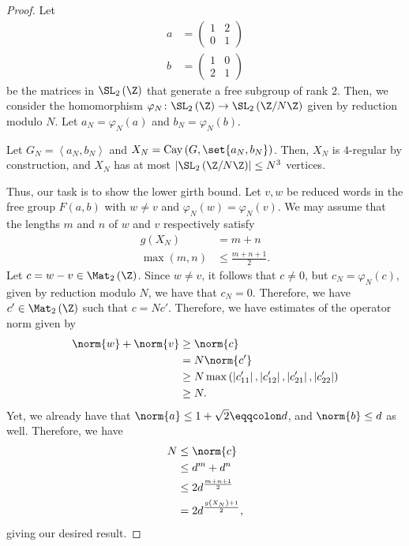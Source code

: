 \documentclass[10pt]{mypackage}
\renewcommand{\eqcolon}{\eqqcolon}
\begin{document}
\begin{proof}
  Let
  \begin{align*}
    a &= \begin{pmatrix}1 & 2 \\ 0 & 1\end{pmatrix}\\
    b &= \begin{pmatrix}1 & 0 \\ 2 & 1\end{pmatrix}
  \end{align*}
  be the matrices in $\SL_2\left( \Z \right)$ that generate a free subgroup of rank $2$. Then, we consider the homomorphism $\varphi_N\colon \SL_2\left( \Z \right)\rightarrow \SL_2\left( \Z/N\Z \right)$ given by reduction modulo $N$. Let $a_N = \varphi_N\left( a \right)$ and $b_N = \varphi_N\left( b \right)$.

  Let $G_N = \left\langle a_N,b_N \right\rangle$ and $X_N = \operatorname{Cay}\left( G,\set{a_N,b_N} \right)$. Then, $X_N$ is $4$-regular by construction, and $X_N$ has at most $\left\vert \SL_2\left( \Z/N\Z \right) \right\vert\leq N^3$ vertices.

  Thus, our task is to show the lower girth bound. Let $v,w$ be reduced words in the free group $F(a,b)$ with $w\neq v$ and $\varphi_N\left( w \right) = \varphi_N\left( v \right)$. We may assume that the lengths $m$ and $n$ of $w$ and $v$ respectively satisfy
  \begin{align*}
    g\left( X_N \right) &= m + n\\
    \max\left( m,n \right) &\leq \frac{m + n + 1}{2}.
  \end{align*}
  Let $c = w-v\in \Mat_{2}\left( \Z \right)$. Since $w\neq v$, it follows that $c\neq 0$, but $c_N = \varphi_N\left( c \right)$, given by reduction modulo $N$, we have that $c_N = 0$. Therefore, we have $c'\in \Mat_2\left( \Z \right)$ such that $c = Nc'$. Therefore, we have estimates of the operator norm given by
  \begin{align*}
    \norm{w} + \norm{v} &\geq \norm{c}\\
                        &= N\norm{c'}\\
                        &\geq N\max\left( \left\vert c'_{11} \right\vert,\left\vert c'_{12} \right\vert,\left\vert c'_{21} \right\vert,\left\vert c'_{22} \right\vert \right)\\
                        &\geq N.
  \end{align*}
  Yet, we already have that $\norm{a} \leq 1 + \sqrt{2}\eqcolon d$, and $\norm{b}\leq d$ as well. Therefore, we have
  \begin{align*}
    N&\leq \norm{c}\\
     &\leq d^m + d^n\\
     &\leq 2d^{\frac{m + n + 1}{2}}\\
     &= 2d^{\frac{g\left( X_N \right) + 1}{2}},
  \end{align*}
  giving our desired result.
\end{proof}
\end{document}
